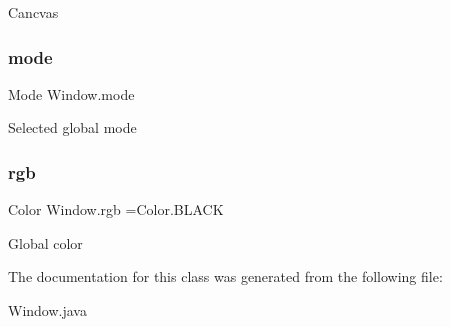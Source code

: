 Cancvas \mbox{\label{class_window_add04f4568154de76f0e5359ab846a3cd}} 
\subsubsection{\texorpdfstring{mode}{mode}}
{\footnotesize\ttfamily Mode Window.\+mode\hspace{0.3cm}{\ttfamily [static]}}

Selected global mode \mbox{\label{class_window_ae9bd15543adc0d59f94321348c0ee8f7}} 
\subsubsection{\texorpdfstring{rgb}{rgb}}
{\footnotesize\ttfamily Color Window.\+rgb =Color.\+B\+L\+A\+CK\hspace{0.3cm}{\ttfamily [static]}}

Global color 

The documentation for this class was generated from the following file\+:\begin{DoxyCompactItemize}
\item 
Window.\+java\end{DoxyCompactItemize}
